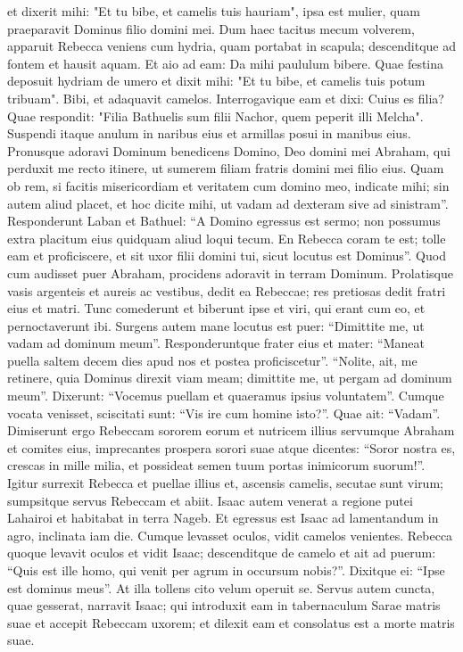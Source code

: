 \begin{biblechapter}
\verse et dixerit mihi: "Et tu bibe, et camelis tuis hauriam", ipsa est mulier, quam praeparavit Dominus filio domini mei. 
\verse Dum haec tacitus mecum volverem, apparuit Rebecca veniens cum hydria, quam portabat in scapula; descenditque ad fontem et hausit aquam. Et aio ad eam: Da mihi paululum bibere. 
\verse Quae festina deposuit hydriam de umero et dixit mihi: "Et tu bibe, et camelis tuis potum tribuam". Bibi, et adaquavit camelos.  
\verse Interrogavique eam et dixi: Cuius es filia? Quae respondit: "Filia Bathuelis sum filii Nachor, quem peperit illi Melcha". Suspendi itaque anulum in naribus eius et armillas posui in manibus eius. 
\verse Pronusque adoravi Dominum benedicens Domino, Deo domini mei Abraham, qui perduxit me recto itinere, ut sumerem filiam fratris domini mei filio eius.  
\verse Quam ob rem, si facitis misericordiam et veritatem cum domino meo, indicate mihi; sin autem aliud placet, et hoc dicite mihi, ut vadam ad dexteram sive ad sinistram”. 
\verse Responderunt Laban et Bathuel: “A Domino egressus est sermo; non possumus extra placitum eius quidquam aliud loqui tecum. 
\verse En Rebecca coram te est; tolle eam et proficiscere, et sit uxor filii domini tui, sicut locutus est Dominus”. 
\verse Quod cum audisset puer Abraham, procidens adoravit in terram Dominum. 
\verse Prolatisque vasis argenteis et aureis ac vestibus, dedit ea Rebeccae; res pretiosas dedit fratri eius et matri. 
\verse Tunc comederunt et biberunt ipse et viri, qui erant cum eo, et pernoctaverunt ibi. Surgens autem mane locutus est puer: “Dimittite me, ut vadam ad dominum meum”.  
\verse Responderuntque frater eius et mater: “Maneat puella saltem decem dies apud nos et postea proficiscetur”. 
\verse “Nolite, ait, me retinere, quia Dominus direxit viam meam; dimittite me, ut pergam ad dominum meum”. 
\verse Dixerunt: “Vocemus puellam et quaeramus ipsius voluntatem”. 
\verse Cumque vocata venisset, sciscitati sunt: “Vis ire cum homine isto?”. Quae ait: “Vadam”. 
\verse Dimiserunt ergo Rebeccam sororem eorum et nutricem illius servumque Abraham et comites eius, 
\verse imprecantes prospera sorori suae atque dicentes: “Soror nostra es, crescas in mille milia, et possideat semen tuum portas inimicorum suorum!”. 
\verse Igitur surrexit Rebecca et puellae illius et, ascensis camelis, secutae sunt virum; sumpsitque servus Rebeccam et abiit. 
\verse Isaac autem venerat a regione putei Lahairoi et habitabat in terra Nageb.  
\verse Et egressus est Isaac ad lamentandum in agro, inclinata iam die. Cumque levasset oculos, vidit camelos venientes. 
\verse Rebecca quoque levavit oculos et vidit Isaac; descenditque de camelo 
\verse et ait ad puerum: “Quis est ille homo, qui venit per agrum in occursum nobis?”. Dixitque ei: “Ipse est dominus meus”. At illa tollens cito velum operuit se. 
\verse Servus autem cuncta, quae gesserat, narravit Isaac; 
\verse qui introduxit eam in tabernaculum Sarae matris suae et accepit Rebeccam uxorem; et dilexit eam et consolatus est a morte matris suae. 
\end{biblechapter}

